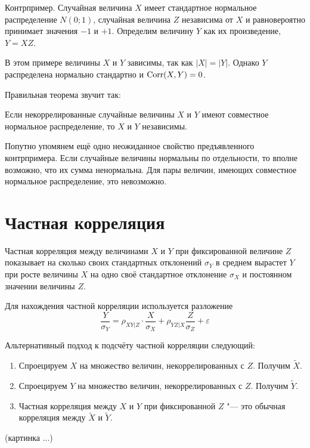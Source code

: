 \documentclass[10pt]{article}
\begin{document}
Контрпример. Случайная величина $X$ имеет стандартное нормальное распределение $N(0;1)$, случайная величина $Z$ независима от $X$ и равновероятно принимает значения $-1$ и $+1$. Определим величину $Y$ как их произведение, $Y=XZ$. 

В этом примере величины $X$ и $Y$ зависимы, так как $|X|=|Y|$. Однако $Y$ распределена нормально стандартно и $\operatorname{Corr}(X,Y)=0$.  

Правильная теорема звучит так:

\begin{theorem}
Если некоррелированные случайные величины $X$ и $Y$ имеют совместное нормальное распределение, то $X$ и $Y$ независимы.
\end{theorem}

Попутно упомянем ещё одно неожиданное свойство предъявленного контрпримера. Если случайные величины нормальны по отдельности, то вполне возможно, что их сумма ненормальна. Для пары величин, имеющих совместное нормальное распределение, это невозможно.


\section{Частная корреляция}

\begin{definition}
Частная корреляция между величинами $X$ и $Y$ при фиксированной величине $Z$ показывает на сколько своих стандартных отклонений $\sigma_Y$ в среднем вырастет $Y$ при росте величины $X$ на одно своё стандартное отклонение $\sigma_X$ и постоянном значении величины $Z$.
\end{definition}

Для нахождения частной корреляции используется разложение
\[
\frac{Y}{\sigma_Y}=\rho_{XY|Z} \cdot \frac{X}{\sigma_X} + \rho_{YZ|X} \frac{Z}{\sigma_Z} + \varepsilon
\]


Альтернативный подход к подсчёту частной корреляции следующий:
\begin{enumerate}
\item Спроецируем $X$ на множество величин, некоррелированных с $Z$. Получим $\tilde{X}$.
\item Спроецируем $Y$ на множество величин, некоррелированных с $Z$. Получим $\tilde{Y}$.
\item Частная корреляция между $X$ и $Y$ при фиксированной $Z$ "--- это обычная корреляция между $\tilde{X}$ и $\tilde{Y}$.
\end{enumerate}


(картинка ...)
\end{document}
